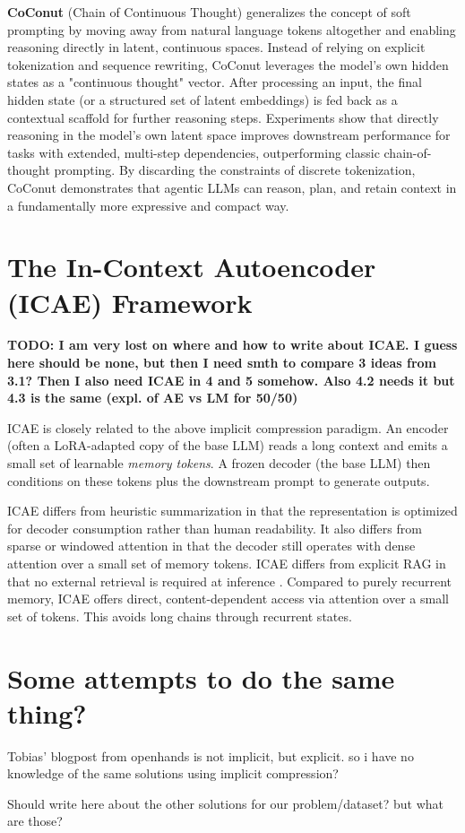 \textbf{CoConut} (Chain of Continuous Thought) \cite{coconut_placeholder,arxiv_2412_06769} generalizes the concept of soft prompting by moving away from natural language tokens altogether and enabling reasoning directly in latent, continuous spaces.
Instead of relying on explicit tokenization and sequence rewriting, CoConut leverages the model's own hidden states as a "continuous thought" vector.
After processing an input, the final hidden state (or a structured set of latent embeddings) is fed back as a contextual scaffold for further reasoning steps.
Experiments show that directly reasoning in the model's own latent space improves downstream performance for tasks with extended, multi-step dependencies, outperforming classic chain-of-thought prompting.
By discarding the constraints of discrete tokenization, CoConut demonstrates that agentic LLMs can reason, plan, and retain context in a fundamentally more expressive and compact way.


\section{The In-Context Autoencoder (ICAE) Framework}

\textbf{TODO: I am very lost on where and how to write about ICAE. 
I guess here should be none, but then I need smth to compare 3 ideas from 3.1?
Then I also need ICAE in 4 and 5 somehow. Also 4.2 needs it but 4.3 is the same (expl. of AE vs LM for 50/50)}

ICAE \cite{ge_-context_2024} is closely related to the above implicit compression paradigm.
An encoder (often a LoRA-adapted copy of the base LLM) reads a long context and emits a small set of learnable \emph{memory tokens}.
A frozen decoder (the base LLM) then conditions on these tokens plus the downstream prompt to generate outputs.


ICAE differs from heuristic summarization in that the representation is optimized for decoder consumption rather than human readability.
It also differs from sparse or windowed attention in that the decoder still operates with dense attention over a small set of memory tokens.
ICAE differs from explicit RAG in that no external retrieval is required at inference \cite{beltagy_longformer_2020,zaheer_bigbird_2020,lewis_rag_2020}.
Compared to purely recurrent memory, ICAE offers direct, content-dependent access via attention over a small set of tokens.
This avoids long chains through recurrent states.



\section{Some attempts to do the same thing?}

Tobias' blogpost from openhands is not implicit, but explicit. so i have no knowledge of the same solutions using implicit compression?

Should write here about the other solutions for our problem/dataset? but what are those?